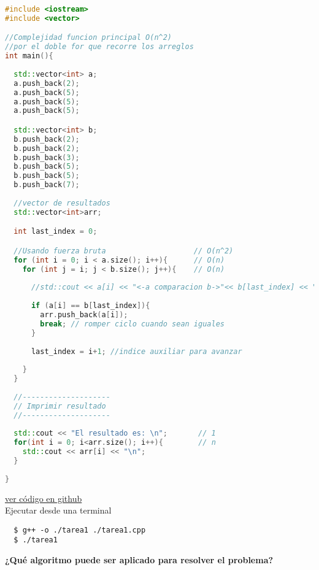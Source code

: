 \documentclass{article}
\begin{document}
\begin{file}
\begin{lstlisting}[language=C++]
#include <iostream>
#include <vector>

//Complejidad funcion principal O(n^2)
//por el doble for que recorre los arreglos
int main(){
  
  std::vector<int> a;
  a.push_back(2);
  a.push_back(5);
  a.push_back(5);
  a.push_back(5);

  std::vector<int> b;
  b.push_back(2);
  b.push_back(2);
  b.push_back(3);
  b.push_back(5);
  b.push_back(5);
  b.push_back(7);
  
  //vector de resultados
  std::vector<int>arr;

  int last_index = 0;

  //Usando fuerza bruta                    // O(n^2)
  for (int i = 0; i < a.size(); i++){      // O(n)
    for (int j = i; j < b.size(); j++){    // O(n)
      
      //std::cout << a[i] << "<-a comparacion b->"<< b[last_index] << "\n";
      
      if (a[i] == b[last_index]){
        arr.push_back(a[i]);
        break; // romper ciclo cuando sean iguales
      }
      
      last_index = i+1; //indice auxiliar para avanzar 
      
    }
  }
  
  //--------------------
  // Imprimir resultado
  //--------------------
  
  std::cout << "El resultado es: \n";       // 1
  for(int i = 0; i<arr.size(); i++){        // n
    std::cout << arr[i] << "\n";
  }
  
}

\end{lstlisting}
\end{file}
\href{https://github.com/luisballado/ADA/blob/main/practice_code/tarea1.cpp}{ver código en github}\\

Ejecutar desde una terminal

\begin{commandline}
\begin{verbatim}
  $ g++ -o ./tarea1 ./tarea1.cpp
  $ ./tarea1
\end{verbatim}
\end{commandline}

\begin{question}
  \textbf{¿Qué algoritmo puede ser aplicado para resolver el problema?}\\
\end{question}
\end{document}

